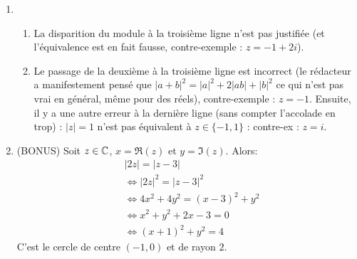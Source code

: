 \begin{exo}
\begin{sol}
\begin{enumerate}
\item \begin{enumerate}
\item  La disparition du module à la troisième ligne n'est pas justifiée (et l'équivalence est en fait fausse, contre-exemple : $z=-1+2i$).
\item  Le passage de la deuxième à la troisième ligne est incorrect (le rédacteur a manifestement pensé que $|a+b|^2=|a|^2+2|ab|+|b|^2$ ce qui n'est pas vrai en général, même  pour des réels), contre-exemple : $z=-1$. Ensuite, il y a une autre erreur à la dernière ligne (sans compter l'accolade en trop) : $|z|=1$ n'est pas équivalent à $z\in\{-1,1\}$ : contre-ex : $z=i$.
\end{enumerate}
\item (BONUS) Soit $z\in \mathbb{C}$, $x=\Re(z)$ et $y=\Im(z)$. Alors:
\begin{align*}
& |2z| = |z-3|\\
&\iff |2z|^2 = |z-3|^2\\
&\iff 4x^2+4y^2=(x-3)^2+y^2\\
&\iff x^2+y^2+2x-3=0\\
&\iff (x+1)^2+y^2=4
\end{align*}
C'est le cercle de centre $(-1,0)$ et de rayon $2$.
\end{enumerate}
\end{sol}

\end{exo}




